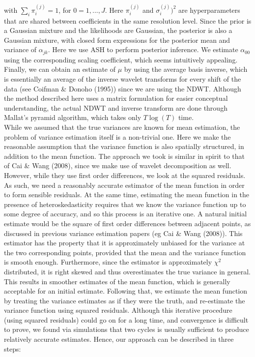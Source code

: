 \documentclass[12pt]{article}
\newcommand{\Ga}{\alpha}
\newcommand{\s}{\sigma}
\begin{document}
with $\sum_i \pi_i^{(j)}=1$, for $0=1,...,J$. Here $\pi_i^{(j)}$ and $\s_i^{(j)})^2$ are hyperparameters that are shared between coefficients in the same resolution level. %
Since the prior is a Gaussian mixture and the likelihoods are Gaussian, the posterior is also a Gaussian mixture, with closed form expressions for the posterior mean and variance of $\Ga_{jk}$. Here we use ASH to perform posterior inference. We estimate $\Ga_{00}$ using the corresponding scaling coefficient, which seems intuitively appealing. Finally, we can obtain an estimate of $\mu$ by using the average basis inverse, which is essentially an average of the inverse wavelet transforms for every shift of the data (see Coifman \& Donoho (1995)) since we are using the NDWT. Although the method described here uses a matrix formulation for easier conceptual understanding, the actual NDWT and inverse transform are done through Mallat's pyramid algorithm, which takes only $T\log(T)$ time.\bigskip\\
While we assumed that the true variances are known for mean estimation, the problem of variance estimation itself is a non-trivial one. Here we make the reasonable assumption that the variance function is also spatially structured, in addition to the mean function. The approach we took is similar in spirit to that of Cai \& Wang (2008), since we make use of wavelet decomposition as well. However, while they use first order differences, we look at the squared residuals. As such, we need a reasonably accurate estimator of the mean function in order to form sensible residuals. At the same time, estimating the mean function in the presence of heteroskedasticity requires that we know the variance function up to some degree of accuracy, and so this process is an iterative one. A natural initial estimate would be the square of first order differences between adjacent points, as discussed in previous variance estimation papers (eg Cai \& Wang (2008)). This estimator has the property that it is approximately unbiased for the variance at the two corresponding points, provided that the mean and the variance function is smooth enough. Furthermore, since the estimator is approximately $\chi^2$ distributed, it is right skewed and thus overestimates the true variance in general. This results in smoother estimates of the mean function, which is generally acceptable for an initial estimate. Following that, we estimate the mean function by treating the variance estimates as if they were the truth, and re-estimate the variance function using squared residuals. Although this iterative procedure (using squared residuals) could go on for a long time, and convergence is difficult to prove, we found via simulations that two cycles is usually sufficient to produce relatively accurate estimates. Hence, our approach can be described in three steps:
\end{document}
